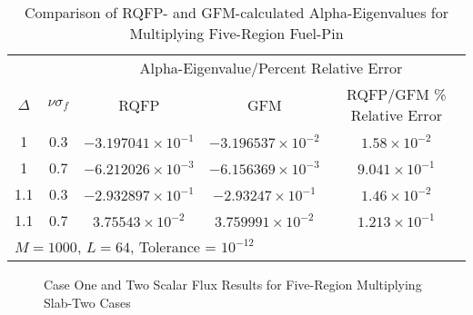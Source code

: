 \begin{table}[!htbp]
\centering{}
\caption{Comparison of RQFP- and GFM-calculated Alpha-Eigenvalues for Multiplying Five-Region Fuel-Pin}
\label{table:FiveRegionCases}
\begin{tabular}{@{}ccccc@{}}\toprule
& & \multicolumn{3}{c}{Alpha-Eigenvalue/Percent Relative Error} \\
\cmidrule{3-5} $\Delta$ & $\nu \sigma_{f}$ & RQFP & GFM & RQFP/GFM \% Relative Error \\
\midrule
1 & 0.3 & $-3.197041 \times 10^{-1}$ & $-3.196537 \times 10^{-2}$ & $1.58 \times 10^{-2}$ \\ 
1 & 0.7 & $-6.212026 \times 10^{-3}$ & $-6.156369 \times 10^{-3}$ & $9.041 \times 10^{-1}$ \\ 
1.1 & 0.3 & $-2.932897 \times 10^{-1}$ & $-2.93247 \times 10^{-1}$ & $1.46 \times 10 ^{-2}$ \\ 
1.1 & 0.7 & $3.75543 \times 10^{-2}$ & $3.759991 \times 10^{-2}$ & $1.213 \times 10^{-1}$ \\ 
\bottomrule
\multicolumn{5}{l}{$M = 1000$, $L = 64$, Tolerance = $10^{-12}$} \\
\end{tabular}
\end{table}

\begin{figure}[!htbp]
	\centering
	\resizebox{0.75\textwidth}{!}{
	
	}
	\caption{Case One and Two Scalar Flux Results for Five-Region Multiplying Slab-Two Cases}
	\label{fig:FiveRegionMultiply}
\end{figure}




